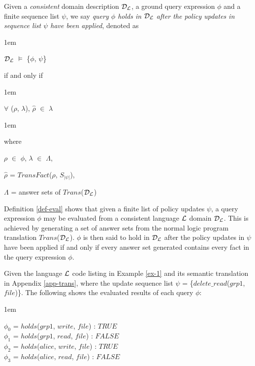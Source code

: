 \documentclass[glov2,twocolumn,final]{svjour2}
\newenvironment{vdefinition}
  {\begin{definition}\hspace{0.1em}}
  {\end{definition}}
\newenvironment{vexample}
  {\begin{example}\hspace{0.1em}}
  {\end{example}}
\newenvironment{vquote}
  {\begin{list}{}{\leftmargin 1em}\item[]}
  {\end{list}}
\begin{document}
    \begin{vdefinition}
      \label{def-eval}
      Given a {\em consistent} domain description ${\cal D}_{\cal L}$, a ground
      query expression $\phi$ and a finite sequence list $\psi$, we say
      {\em query $\phi$ holds in ${\cal D}_{\cal L}$ after the policy updates
      in sequence list $\psi$ have been applied}, denoted as

      \begin{vquote}
        ${\cal D}_{\cal L}$ $\models$ \{$\phi$, $\psi$\}
      \end{vquote}

      \noindent
      if and only if

      \begin{vquote}
        $\forall$ ($\rho$, $\lambda$),
        $\hat{\rho}$ $\in$ $\lambda$

      \end{vquote}

      \begin{vquote}
        where

        $\rho$ $\in$ $\phi$,
        $\lambda$ $\in$ $\Lambda$,

        $\hat{\rho}$ = $TransFact$($\rho$, $S_{|\psi|}$),

        $\Lambda$ = answer sets of $Trans$(${\cal D}_{\cal L}$)
      \end{vquote}
    \end{vdefinition}

    Definition \ref{def-eval} shows that given a finite list of policy updates
    $\psi$, a query expression $\phi$ may be evaluated from a consistent
    language ${\cal L}$ domain ${\cal D_{L}}$. This is achieved by generating a
    set of answer sets from the normal logic program translation
    $Trans$(${\cal D_{L}}$). $\phi$ is then said to hold in ${\cal D_{L}}$
    after the policy updates in $\psi$ have been applied if and only if every
    answer set generated contains every fact in the query expression $\phi$.

    \begin{vexample}
      \label{ex-2}
      Given the language ${\cal L}$ code listing in Example \ref{ex-1} and its
      semantic translation in Appendix \ref{app-trans}, where the update
      sequence list $\psi$ = \{$delete\_read$($grp1$, $file$)\}. The following
      shows the evaluated results of each query $\phi$:

      \begin{vquote}
        $\phi_{0}$ = $holds$($grp1$, $write$, $file$) : $TRUE$ \\
        $\phi_{1}$ = $holds$($grp1$, $read$, $file$) : $FALSE$ \\
        $\phi_{2}$ = $holds$($alice$, $write$, $file$) : $TRUE$ \\
        $\phi_{3}$ = $holds$($alice$, $read$, $file$) : $FALSE$
      \end{vquote}
    \end{vexample}
\end{document}
